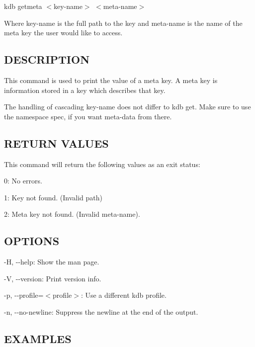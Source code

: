 {\ttfamily kdb getmeta $<$key-\/name$>$ $<$meta-\/name$>$}

Where {\ttfamily key-\/name} is the full path to the key and {\ttfamily meta-\/name} is the name of the meta key the user would like to access.

\subsection*{D\+E\+S\+C\+R\+I\+P\+T\+I\+O\+N}

This command is used to print the value of a meta key. A meta key is information stored in a key which describes that key.

The handling of cascading {\ttfamily key-\/name} does not differ to {\ttfamily kdb get}. Make sure to use the namespace {\ttfamily spec}, if you want meta-\/data from there.

\subsection*{R\+E\+T\+U\+R\+N V\+A\+L\+U\+E\+S}

This command will return the following values as an exit status\+:
\begin{DoxyItemize}
\item 0\+: No errors.
\item 1\+: Key not found. (Invalid {\ttfamily path})
\item 2\+: Meta key not found. (Invalid {\ttfamily meta-\/name}).
\end{DoxyItemize}

\subsection*{O\+P\+T\+I\+O\+N\+S}


\begin{DoxyItemize}
\item {\ttfamily -\/\+H}, {\ttfamily -\/-\/help}\+: Show the man page.
\item {\ttfamily -\/\+V}, {\ttfamily -\/-\/version}\+: Print version info.
\item {\ttfamily -\/p}, {\ttfamily -\/-\/profile}=$<$profile$>$\+: Use a different kdb profile.
\item {\ttfamily -\/n}, {\ttfamily -\/-\/no-\/newline}\+: Suppress the newline at the end of the output.
\end{DoxyItemize}

\subsection*{E\+X\+A\+M\+P\+L\+E\+S}


